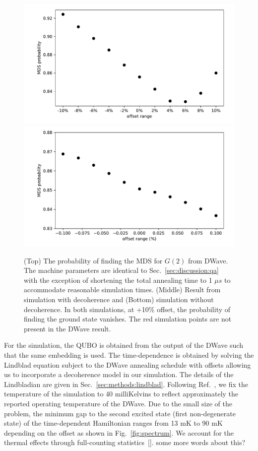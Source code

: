 \documentclass[prd,twocolumn,tightenlines,preprintnumbers,showpacs,superscriptaddress,notitlepage,nofootinbib,eqsecnum,floatfix,longbibliography]{revtex4}
\begin{document}
\begin{figure}
	\centering
	\includegraphics[width=\columnwidth]{./figures/dwave1us.pdf}
	\includegraphics[width=\columnwidth]{./figures/sim_deco.pdf}
	\caption{ (Top) The probability of finding the MDS for $G(2)$ from DWave. The machine parameters are identical to Sec.~\ref{sec:discussion:qa} with the exception of shortening the total annealing time to 1 $\mu s$ to accommodate reasonable simulation times. (Middle) Result from simulation with decoherence and (Bottom) simulation without decoherence. In both simulations, at +10\% offset, the probability of finding the ground state vanishes. The red simulation points are not present in the DWave result.}
	\label{fig:dwave1us}
\end{figure}

For the simulation, the QUBO is obtained from the output of the DWave such that the same embedding is used. The time-dependence is obtained by solving the Lindblad equation subject to the DWave annealing schedule with offsets allowing us to incorporate a decoherence model in our simulation. The details of the Lindbladian are given in Sec.~\ref{sec:methods:lindblad}. Following Ref.~\cite{}, we fix the temperature of the simulation to 40 milliKelvins to reflect approximately the reported operating temperature of the DWave. Due to the small size of the problem, the minimum gap to the second excited state (first non-degenerate state) of the time-dependent Hamiltonian ranges from 13 mK to 90 mK depending on the offset as shown in Fig.~\ref{fig:spectrum}. We account for the thermal effects through full-counting statistics~\ref{}. {\color{red}some more words about this?}
\end{document}
